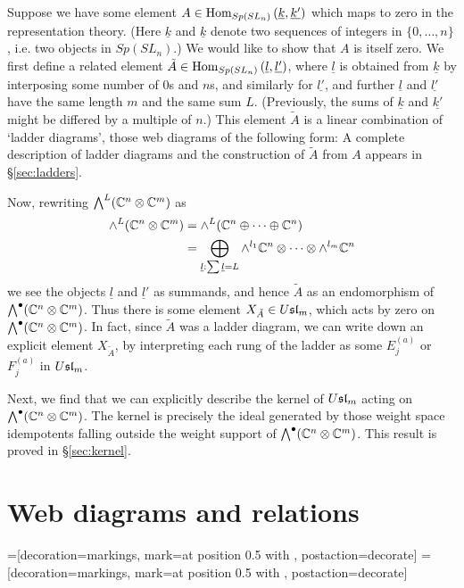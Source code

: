 \documentclass[11pt,leqno]{article}
\begin{document}
Suppose we have some element $A \in \operatorname{Hom}_{Sp(SL_n)}\left(\underline{k},\underline{k'}\right)$ which maps to zero in the representation theory. (Here $\underline{k}$ and $\underline{k}$ denote two sequences of integers in $\{0,\ldots,n\}$, i.e. two objects in $Sp(SL_n)$.) We would like to show that $A$ is itself zero. We first define a related element $\tilde{A} \in \operatorname{Hom}_{Sp(SL_n)}\left(\underline{l},\underline{l'}\right)$, where $\underline{l}$ is obtained from $\underline{k}$ by interposing some number of $0$s and $n$s, and similarly for $\underline{l'}$, and further $\underline{l}$ and $\underline{l'}$ have the same length $m$ and the same sum $L$. (Previously, the sums of $\underline{k}$ and $\underline{k'}$ might be differed by a multiple of $n$.) This element $\tilde{A}$ is a linear combination of `ladder diagrams', those web diagrams of the following form:
A complete description of ladder diagrams and the construction of $\tilde{A}$ from $A$ appears in \S \ref{sec:ladders}.

Now, rewriting $\bigwedge^L(\mathbb C^n \otimes \mathbb C^m)$ as
\begin{align*}
\wedge^L(\mathbb C^n \otimes \mathbb C^m) & = \wedge^L(\mathbb C^n \oplus \cdots \oplus \mathbb C^n) \\
        & = \bigoplus_{\underline{l}: \sum \underline{l} = L} \wedge^{l_1} \mathbb C^n \otimes \cdots \otimes \wedge^{l_m} \mathbb C^n
\end{align*}
we see the objects $\underline{l}$ and $\underline{l}'$ as summands, and hence $\tilde{A}$ as an endomorphism of $\bigwedge^\bullet(\mathbb C^n \otimes \mathbb C^m)$. Thus there is some element $X_{\tilde{A}} \in U\mathfrak{sl}_{m}$, which acts by zero on $\bigwedge^\bullet(\mathbb C^n \otimes \mathbb C^m)$. In fact, since $\tilde{A}$ was a ladder diagram, we can write down an explicit element $X_{\tilde{A}}$, by interpreting each rung of the ladder as some $E^{(a)}_j$ or $F^{(a)}_j$ in $U\mathfrak{sl}_{m}$. 

Next, we find that we can explicitly describe the kernel of $U\mathfrak{sl}_{m}$ acting on $\bigwedge^\bullet(\mathbb C^n \otimes \mathbb C^m)$. The kernel is precisely the ideal generated by those weight space idempotents falling outside the weight support of $\bigwedge^\bullet(\mathbb C^n \otimes \mathbb C^m)$.  This result is proved in \S \ref{sec:kernel}.


\section{Web diagrams and relations}
\label{sec:diagrams}
=[decoration={markings, mark=at position 0.5 with {\arrow{>}}}, postaction={decorate}]
=[decoration={markings, mark=at position 0.5 with {\arrow{<}}}, postaction={decorate}]
\end{document}
